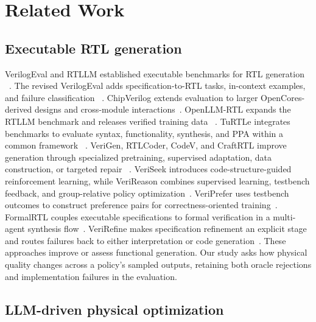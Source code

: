 \section{Related Work}
\label{sec:related}

\subsection{Executable RTL generation}

VerilogEval and RTLLM established executable benchmarks for RTL generation
~\cite{liu2023verilogeval,lu2024rtllm}. The revised VerilogEval adds
specification-to-RTL tasks, in-context examples, and failure classification
~\cite{pinckney2025revisiting}. ChipVerilog extends evaluation to larger
OpenCores-derived designs and cross-module interactions~\cite{tan2026chipverilog}.
OpenLLM-RTL expands the RTLLM benchmark and releases verified training data
~\cite{liu2024openllmrtl}. TuRTLe integrates benchmarks to evaluate syntax,
functionality, synthesis, and PPA within a common framework
~\cite{garciagasulla2025turtle}.
VeriGen, RTLCoder, CodeV, and CraftRTL improve generation through specialized
pretraining, supervised adaptation, data construction, or targeted repair
~\cite{thakur2024verigen,liu2024rtlcoder,zhao2024codev,liu2024craftrtl}.
VeriSeek introduces code-structure-guided reinforcement learning, while
VeriReason combines supervised learning, testbench feedback, and group-relative
policy optimization~\cite{wang2024veriseek,wang2025verireason}. VeriPrefer uses
testbench outcomes to construct preference pairs for correctness-oriented
training~\cite{wang2026veriprefer}. FormalRTL
couples executable specifications to formal verification in a multi-agent
synthesis flow~\cite{formalrtl2026}. VeriRefine makes specification refinement
an explicit stage and routes failures back to either interpretation or code
generation~\cite{kong2026verirefine}. These approaches improve or assess
functional generation. Our study asks how physical quality changes across a
policy's sampled outputs, retaining both oracle rejections and implementation
failures in the evaluation.

\subsection{LLM-driven physical optimization}

